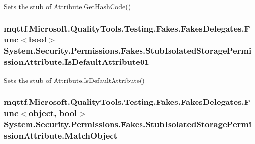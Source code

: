 Sets the stub of Attribute.\-Get\-Hash\-Code()

\hypertarget{class_system_1_1_security_1_1_permissions_1_1_fakes_1_1_stub_isolated_storage_permission_attribute_a023586b5498d6c4fcc93293fbc7b6eea}{
\subsubsection[{Is\-Default\-Attribute01}]{\setlength{\rightskip}{0pt plus 5cm}mqttf.\-Microsoft.\-Quality\-Tools.\-Testing.\-Fakes.\-Fakes\-Delegates.\-Func$<$bool$>$ System.\-Security.\-Permissions.\-Fakes.\-Stub\-Isolated\-Storage\-Permission\-Attribute.\-Is\-Default\-Attribute01}}\label{class_system_1_1_security_1_1_permissions_1_1_fakes_1_1_stub_isolated_storage_permission_attribute_a023586b5498d6c4fcc93293fbc7b6eea}


Sets the stub of Attribute.\-Is\-Default\-Attribute()

\hypertarget{class_system_1_1_security_1_1_permissions_1_1_fakes_1_1_stub_isolated_storage_permission_attribute_a20a0ae980f3ea0096b3f1b39cda7f90d}{
\subsubsection[{Match\-Object}]{\setlength{\rightskip}{0pt plus 5cm}mqttf.\-Microsoft.\-Quality\-Tools.\-Testing.\-Fakes.\-Fakes\-Delegates.\-Func$<$object, bool$>$ System.\-Security.\-Permissions.\-Fakes.\-Stub\-Isolated\-Storage\-Permission\-Attribute.\-Match\-Object}}\label{class_system_1_1_security_1_1_permissions_1_1_fakes_1_1_stub_isolated_storage_permission_attribute_a20a0ae980f3ea0096b3f1b39cda7f90d}


